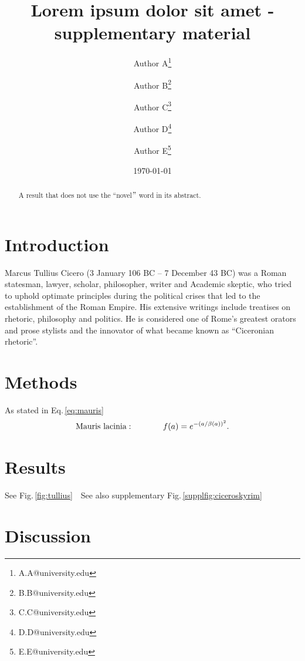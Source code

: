 \documentclass[fleqn]{scrartcl}%
\title{Lorem ipsum dolor sit amet - supplementary material}%
\author[1]{Author A\thanks{A.A@university.edu}}
\author[1]{Author B\thanks{B.B@university.edu}}
\author[1]{Author C\thanks{C.C@university.edu}}
\author[2]{Author D\thanks{D.D@university.edu}}
\author[2]{Author E\thanks{E.E@university.edu}}
\affil[1]{Department of Computer Science, \LaTeX\ University}
\affil[2]{Department of Mechanical Engineering, \LaTeX\ University}
\date{\today}%
\begin{document}
    \maketitle
    \begin{abstract}
        A result that does not use the ``novel\("\) word in its abstract.
    \end{abstract}


    \clearpage
    \section*{Introduction}
    Marcus Tullius Cicero (3 January 106 BC – 7 December 43 BC) was a Roman statesman, lawyer, scholar, philosopher,
    writer and Academic skeptic, who tried to uphold optimate principles during the political crises that led to the
    establishment of the Roman Empire.\cite{abalem2018double}
    His extensive writings include treatises on rhetoric, philosophy and politics.
    He is considered one of Rome's greatest orators and prose stylists
    and the innovator of what became known as ``Ciceronian rhetoric''.

    \clearpage
    \section*{Methods}
    As stated in Eq.\,\ref{eq:mauris}
    \newline
    \blindtext
    \begin{align}\label{eq:mauris}
        \textnormal{Mauris lacinia}: \hspace{0.5in}	 f(a) = e^{-(a/\beta(a))^2}.
    \end{align}



    \clearpage
    \section*{Results}
    See Fig.\,\ref{fig:tullius}
    \newline
    \blindtext\,\
    See also supplementary Fig.\,\ref{supplfig:ciceroskyrim}


    \clearpage
    \section*{Discussion}
    \blindtext
\end{document}
